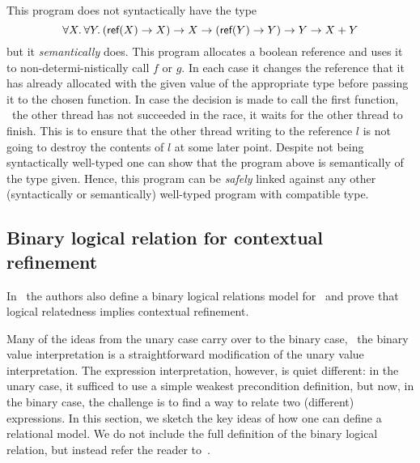 This program does not syntactically have the type
\[\Tall \tvar. \Tall \tvarB. (\Tref(\tvar) \to \tvar) \to \tvar
  \to (\Tref(\tvarB) \to \tvarB) \to \tvarB \to \tvar + \tvarB\] 
  but
it \emph{semantically} does. This program allocates a boolean
reference and uses it to non-determi-nistically call $f$ or $g$. In
each case it changes the reference that it has already allocated with
the given value of the appropriate type before passing it to the
chosen function. In case the decision is made to call the first
function, \ie\ the other thread has not succeeded in the race, it
waits for the other thread to finish. This is to ensure that the other
thread writing to the reference $l$ is not going to destroy the
contents of $l$ at some later point. Despite not being syntactically
well-typed one can show that the program above is semantically of the
type given. Hence, this program can be \emph{safely} linked against
any other (syntactically or semantically) well-typed program with
compatible type. 

\subsection{Binary logical relation for contextual refinement}
\label{sec:binary-logical-relation}

In~\cite{timany:logrel-in-iris} the authors also define a binary logical relations model for \TheLang\ and prove that logical relatedness implies contextual refinement.

Many of the ideas from the unary case carry over to the binary case, \eg\ the binary value interpretation is a straightforward modification of the unary value interpretation. 
The expression interpretation, however, is quiet different: in the unary case, it sufficed to use a simple weakest precondition definition, but now, in the binary case,
the challenge is to find a way to relate two (different) expressions.
In this section, we sketch the key ideas of how one can define a relational model. We do not include the full definition of the binary logical relation, but instead refer the
reader to~\cite{timany:logrel-in-iris}.

